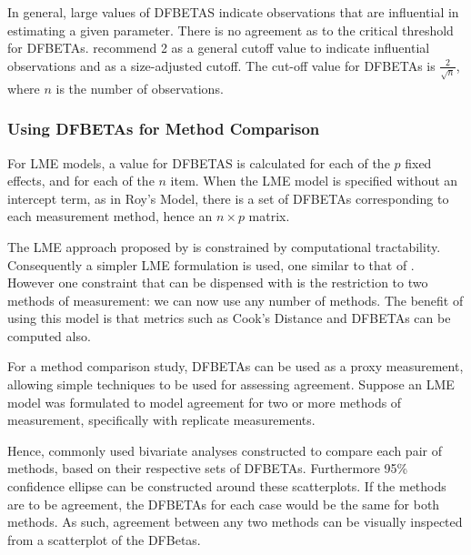 \documentclass[12pt, a4paper]{report}
\theoremstyle{plain}
\theoremstyle{definition}
\theoremstyle{remark}
\begin{document}
In general, large values of DFBETAS indicate observations that are influential in estimating a given parameter. There is no agreement as to the critical threshold for DFBETAs. \citet{belsley2005} recommend 2 as a general cutoff value to indicate influential observations and as a size-adjusted cutoff.  The cut-off value for DFBETAs is $\frac{2}{\sqrt{n}}$, where $n$ is the number of observations. 



\subsubsection{Using DFBETAs for Method Comparison}
For LME models, a value for DFBETAS is calculated for each of the $p$ fixed effects, and for each of the $n$ item. When the LME model is specified without an intercept term, as in Roy's Model, there is a set of DFBETAs corresponding to each measurement method, hence an $n \times p$ matrix.
	
The LME approach proposed by \citet{ARoy2009} is constrained by computational tractability. Consequently a simpler LME formulation is used, one similar to that of \citet{BXC2008}. However one constraint that can be dispensed with is the restriction to two methods of measurement: we can now use any number of methods. The benefit of using this model is that metrics such as Cook's Distance and DFBETAs can be computed also.
	
For a method comparison study, DFBETAs can be used as a proxy measurement, allowing simple techniques to be used for assessing agreement. Suppose an LME model was formulated to model agreement for two or more methods of measurement, specifically with replicate measurements.

Hence, commonly used bivariate analyses constructed to compare each pair of methods, based on their respective sets of DFBETAs. Furthermore 95\% confidence ellipse can be constructed around these scatterplots. If the methods are to be agreement, the DFBETAs for each case would be the same for both methods. As such, agreement between any two methods can be visually inspected from a scatterplot of the DFBetas. 
	

\end{document}
